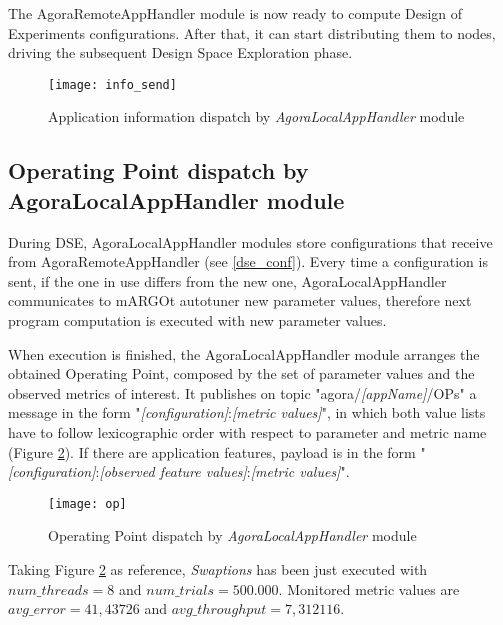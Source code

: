 The AgoraRemoteAppHandler module is now ready to compute Design of Experiments configurations. After that, it can start distributing them to nodes, driving the subsequent Design Space Exploration phase.

\begin{figure}[t]

    \centering
    \texttt{[image: info\_send]}
    \caption{Application information dispatch by \textit{AgoraLocalAppHandler} module}
    \label{fig:info_send}
    
\end{figure}





\subsection{Operating Point dispatch by AgoraLocalAppHandler module}\label{opSend}

During DSE, AgoraLocalAppHandler modules store configurations that receive from AgoraRemoteAppHandler (see \ref{dse_conf}). Every time a configuration is sent, if the one in use differs from the new one, AgoraLocalAppHandler communicates to mARGOt autotuner new parameter values, therefore next program computation is executed with new parameter values.

When execution is finished, the AgoraLocalAppHandler module arranges the obtained Operating Point, composed by the set of parameter values and the observed metrics of interest. It publishes on topic "agora/\textit{[appName]}/OPs" a message in the form "\textit{[configuration]}:\textit{[metric values]}", in which both value lists have to follow lexicographic order with respect to parameter and metric name (Figure \ref{fig:op}). If there are application features, payload is in the form "\textit{[configuration]}:\textit{[ob\-served feature values]}:\textit{[metric values]}".

\begin{figure}[htb]

    \centering
    \texttt{[image: op]}
    \caption{Operating Point dispatch by \textit{AgoraLocalAppHandler} module}
    \label{fig:op}
    
\end{figure}

Taking Figure \ref{fig:op} as reference, \textit{Swaptions} has been just executed with\linebreak $num\_threads = 8$ and $num\_trials = 500.000$. Monitored metric values are $avg\_error = 41,43726$ and $avg\_throughput = 7,312116$.

